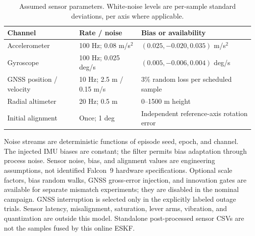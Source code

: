 \begin{table}[!htbp]\centering\small
\caption{Assumed sensor parameters. White-noise levels are per-sample standard deviations,
per axis where applicable.}\label{tab:nav-sensors}
\begin{tabularx}{\textwidth}{lYY}\toprule
Channel & Rate / noise & Bias or availability\\\midrule
Accelerometer & 100 Hz; 0.08 m/s$^2$ & $(0.025,-0.020,0.035)$ m/s$^2$\\
Gyroscope & 100 Hz; 0.025 deg/s & $(0.005,-0.006,0.004)$ deg/s\\
GNSS position / velocity & 10 Hz; 2.5 m / 0.15 m/s & 3\% random loss per scheduled sample\\
Radial altimeter & 20 Hz; 0.5 m & 0--1500 m height\\
Initial alignment & Once; 1 deg & Independent reference-axis rotation error\\\bottomrule
\end{tabularx}
\end{table}
Noise streams are deterministic functions of episode seed, epoch, and channel. The
injected IMU biases are constant; the filter permits bias adaptation through process
noise. Sensor noise, bias, and alignment values are engineering assumptions, not
identified Falcon~9 hardware specifications. Optional scale factors, bias random walks,
GNSS gross-error injection, and innovation gates are available for separate mismatch
experiments; they are disabled in the nominal campaign. GNSS interruption is selected
only in the explicitly labeled outage trials. Sensor latency, misalignment, saturation,
lever arms, vibration, and quantization are outside this model. Standalone
post-processed sensor CSVs are not the samples fused by this online ESKF.

